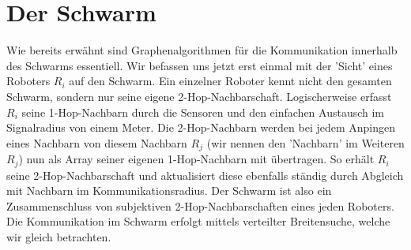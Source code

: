\section{Der Schwarm}

Wie bereits erwähnt sind Graphenalgorithmen für die Kommunikation innerhalb des Schwarms essentiell.
Wir befassen uns jetzt erst einmal mit der 'Sicht' eines Roboters $R_i$ auf den Schwarm. Ein einzelner 
Roboter kennt nicht den gesamten Schwarm, sondern nur seine eigene 2-Hop-Nachbarschaft. Logischerweise
erfasst $R_i$ seine 1-Hop-Nachbarn durch die Sensoren und den einfachen Austausch im Signalradius von 
einem Meter. Die 2-Hop-Nachbarn werden bei jedem Anpingen eines Nachbarn von diesem Nachbarn $R_j$ (wir
nennen den 'Nachbarn' im Weiteren $R_j$) nun als Array seiner eigenen 1-Hop-Nachbarn mit übertragen.
So erhält $R_i$ seine 2-Hop-Nachbarschaft und aktualisiert diese ebenfalls ständig durch Abgleich mit
Nachbarn im Kommunikationsradius. Der Schwarm ist also ein Zusammenschluss von subjektiven 
2-Hop-Nachbarschaften eines jeden Roboters. Die Kommunikation im Schwarm erfolgt mittels verteilter
Breitensuche, welche wir gleich betrachten.